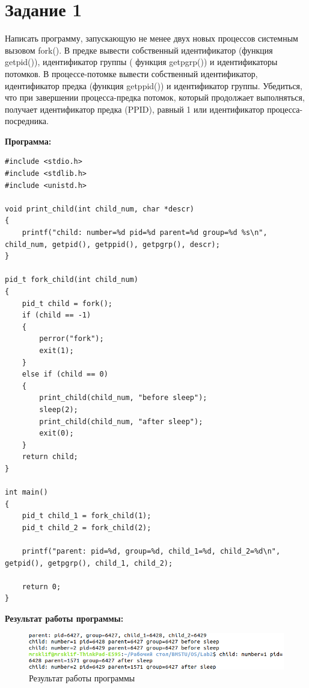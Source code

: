 \documentclass[14pt, a4paper]{extarticle}
\begin{document}
\section*{Задание 1}
Написать программу, запускающую не менее двух новых процессов системным вызовом fork(). В предке вывести собственный идентификатор (функция getpid()), идентификатор группы ( функция getpgrp()) и идентификаторы потомков. В процессе-потомке вывести собственный идентификатор, идентификатор предка (функция getppid()) и идентификатор группы. Убедиться, что при завершении процесса-предка потомок, который продолжает выполняться, получает идентификатор предка (PPID), равный 1 или идентификатор процесса-посредника.\par
\textbf{Программа:}
\begin{lstlisting}[label=task1, caption=Задание 1]
#include <stdio.h> 
#include <stdlib.h> 
#include <unistd.h>

void print_child(int child_num, char *descr)
{
	printf("child: number=%d pid=%d parent=%d group=%d %s\n", child_num, getpid(), getppid(), getpgrp(), descr);
}

pid_t fork_child(int child_num) 
{
	pid_t child = fork();
	if (child == -1)
	{
		perror("fork");
		exit(1);
	}
	else if (child == 0) 
	{
		print_child(child_num, "before sleep");
		sleep(2);
		print_child(child_num, "after sleep");
		exit(0);
	}
	return child;
}

int main() 
{
	pid_t child_1 = fork_child(1);
	pid_t child_2 = fork_child(2);
	
	printf("parent: pid=%d, group=%d, child_1=%d, child_2=%d\n", getpid(), getpgrp(), child_1, child_2);
	
	return 0;
}
\end{lstlisting}\par
\textbf{Результат работы программы:}\par
\begin{figure}[h!]
	\centering
	\includegraphics[width=\textwidth]{source/1.png}
	\caption{Результат работы программы}
	\label{Example1}
\end{figure}\par

\clearpage
\end{document}
